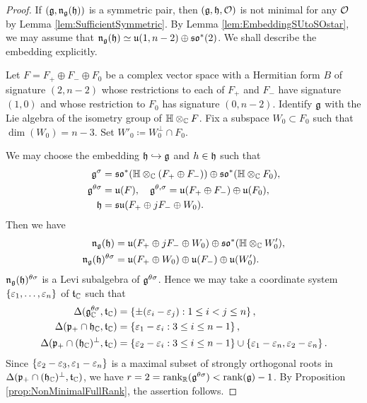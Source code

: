 \begin{proof}
	If $(\mathfrak{g}, \mathfrak{n}_{\mathfrak{g}}(\mathfrak{h}))$ is a symmetric pair, then $(\mathfrak{g}, \mathfrak{h}, \mathcal{O})$ is not minimal for any $\mathcal{O}$ by Lemma \ref{lem:SufficientSymmetric}.
	By Lemma \ref{lem:EmbeddingSUtoSOstar}, we may assume that $\mathfrak{n}_{\mathfrak{g}}(\mathfrak{h}) \simeq \mathfrak{u}(1, n-2) \oplus \mathfrak{so}^*(2)$.
	We shall describe the embedding explicitly.

	Let $F = F_+ \oplus F_- \oplus F_0$ be a complex vector space with a Hermitian form $B$ of signature $(2, n - 2)$ whose restrictions to each of $F_+$ and $F_-$ have signature $(1, 0)$ and whose restriction to $F_0$ has signature $(0, n - 2)$.
	Identify $\mathfrak{g}$ with the Lie algebra of the isometry group of $\mathbb{H}\otimes_{\mathbb{C}} F$.
	Fix a subspace $W_0\subset F_0$ such that $\dim(W_0) = n - 3$.
	Set $W'_0 \coloneq W_0^\perp \cap F_0$.

	We may choose the embedding $\mathfrak{h} \hookrightarrow \mathfrak{g}$ and $h \in \mathfrak{h}$ such that
	\begin{align*}
		\mathfrak{g}^{\sigma} &= \mathfrak{so}^*(\mathbb{H}\otimes_{\mathbb{C}} (F_{+}\oplus F_{-})) \oplus \mathfrak{so}^*(\mathbb{H}\otimes_{\mathbb{C}}F_0), \\
		\mathfrak{g}^{\theta\sigma} &= \mathfrak{u}(F), \quad \mathfrak{g}^{\theta, \sigma} = \mathfrak{u}(F_+ \oplus F_-) \oplus \mathfrak{u}(F_0), \\
		\mathfrak{h} &= \mathfrak{su}(F_{+} \oplus jF_- \oplus W_0).
	\end{align*}
	Then we have
	\begin{align*}
		\mathfrak{n}_{\mathfrak{g}}(\mathfrak{h}) &= \mathfrak{u}(F_{+} \oplus jF_-\oplus W_0) \oplus \mathfrak{so}^*(\mathbb{H}\otimes_{\mathbb{C}} W'_0), \\
		\mathfrak{n}_{\mathfrak{g}}(\mathfrak{h})^{\theta\sigma} &= \mathfrak{u}(F_{+} \oplus W_0) \oplus \mathfrak{u}(F_-) \oplus \mathfrak{u}(W'_0).
	\end{align*}
	$\mathfrak{n}_{\mathfrak{g}}(\mathfrak{h})^{\theta\sigma}$ is a Levi subalgebra of $\mathfrak{g}^{\theta\sigma}$.
	Hence we may take a coordinate system $\left\{\varepsilon_1, \ldots, \varepsilon_n \right\}$ of $\mathfrak{t}_{\mathbb{C}}$ such that
	\begin{align*}
		\Delta(\mathfrak{g}_{\mathbb{C}}^{\theta\sigma}, \mathfrak{t}_{\mathbb{C}}) &= \left\{\pm (\varepsilon_i - \varepsilon_j) : 1\leq i < j \leq n \right\}, \\
		\Delta(\mathfrak{p}_+\cap \mathfrak{h}_{\mathbb{C}}, \mathfrak{t}_{\mathbb{C}}) &= \left\{\varepsilon_1 - \varepsilon_i : 3\leq i \leq n-1 \right\}, \\
		\Delta(\mathfrak{p}_+\cap (\mathfrak{h}_{\mathbb{C}})^\perp, \mathfrak{t}_{\mathbb{C}}) &= \left\{ \varepsilon_2 - \varepsilon_i : 3 \leq i \leq n-1 \right\} \cup \left\{\varepsilon_1 - \varepsilon_n, \varepsilon_2 - \varepsilon_n \right\}.
	\end{align*}
	Since $\left\{\varepsilon_2 - \varepsilon_3, \varepsilon_1 - \varepsilon_n \right\}$ is a maximal subset of strongly orthogonal roots in $\Delta(\mathfrak{p}_+\cap (\mathfrak{h}_{\mathbb{C}})^\perp, \mathfrak{t}_{\mathbb{C}})$, we have $r = 2 = \operatorname{rank}_{\mathbb{R}}(\mathfrak{g}^{\theta\sigma}) < \operatorname{rank}(\mathfrak{g}) - 1$.
	By Proposition \ref{prop:NonMinimalFullRank}, the assertion follows.
\end{proof}

